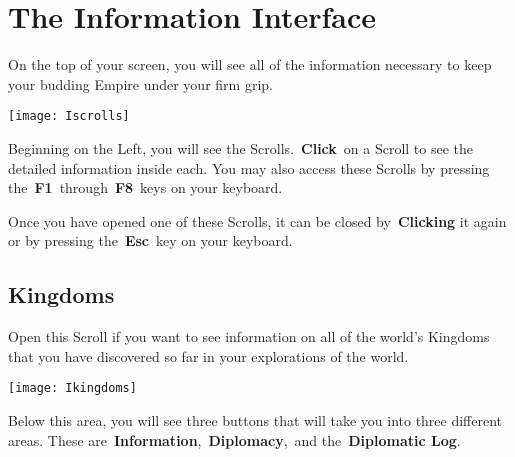 
\chapter{The Information Interface}


On the top of your screen, you will see all of the information necessary to keep your budding Empire under your firm grip.

\begin{center}
	\texttt{[image: Iscrolls]}
\end{center}

Beginning on the Left, you will see the Scrolls. \textbf{Click} on a Scroll to see the detailed information inside each. You may also access these Scrolls by pressing the \textbf{F1} through \textbf{F8} keys on your keyboard.

Once you have opened one of these Scrolls, it can be closed by \textbf{Clicking} it again or by pressing the \textbf{Esc} key on your keyboard.

\section{Kingdoms}

Open this Scroll if you want to see information on all of the world’s Kingdoms that you have discovered so far in your explorations of the world.

\begin{center}
	\texttt{[image: Ikingdoms]}
\end{center}

Below this area, you will see three buttons that will take you into three different areas. These are \textbf{Information}, \textbf{Diplomacy}, and the \textbf{Diplomatic Log}.

